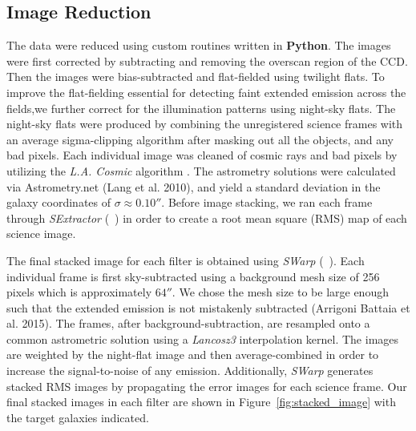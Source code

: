 \documentclass[twocolumn]{aastex61}
\newcommand{\citeth}[1]{(\citeauthor{#1}\ \citeyear{#1})}
\begin{document}
\subsection{Image Reduction}
The data were reduced using custom routines written in \textbf{Python}. 
The images were first corrected by subtracting and removing the overscan region of the CCD. 
Then the images were bias-subtracted and flat-fielded using twilight flats.
To improve the flat-fielding essential for detecting faint extended emission across the fields,we further correct for the illumination patterns using night-sky flats. The night-sky flats were produced by combining the unregistered science frames with an average sigma-clipping algorithm after masking out all the objects, and any bad pixels. Each individual image was cleaned of cosmic rays and bad pixels by utilizing the \emph{L.A. Cosmic} algorithm \citep{Dokkum2001}.
The astrometry solutions were calculated via Astrometry.net (Lang et al. 2010)\nocite{Lang}, and yield a standard deviation in the galaxy coordinates of $\sigma \approx 0.10''$. Before image stacking, we ran each frame through \emph{SExtractor} \citeth{Bertin} in order to create a root mean square (RMS) map of each science image.


The final stacked image for each filter is obtained using \emph{SWarp} \citeth{Bertin}.
Each individual frame is first sky-subtracted using a background mesh size of 256 pixels which is approximately $64''$. 
We chose the mesh size to be large enough such that the extended emission is not mistakenly subtracted (Arrigoni Battaia et al. 2015)\nocite{Battaia_2015}. 
The frames, after background-subtraction, are resampled onto a common astrometric solution using a \textit{Lancosz3} interpolation kernel. 
The images are weighted by the night-flat image and then  average-combined  in order to increase the signal-to-noise of any  emission. Additionally, \emph{SWarp} generates stacked RMS images by propagating the error images for each science frame.
Our final stacked images in each filter are shown in Figure~\ref{fig:stacked_image} with the target galaxies indicated.  
\end{document}
